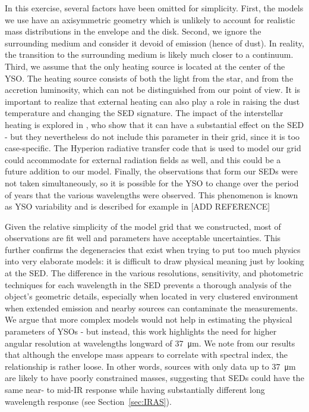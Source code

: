 In this exercise, several factors have been omitted for simplicity. First, the models we use have an axisymmetric geometry which is unlikely to account for realistic mass distributions in the envelope and the disk. Second, we ignore the surrounding medium and consider it devoid of emission (hence of dust). In reality, the transition to the surrounding medium is likely much closer to a continuum. Third, we assume that the only heating source is located at the center of the YSO. The heating source consists of both the light from the star, and from the accretion luminosity, which can not be distinguished from our point of view. It is important to realize that external heating can also play a role in raising the dust temperature and changing the SED signature. The impact of the interstellar heating is explored in \citet{Furlan:2016df}, who show that it can have a substantial effect on the SED - but they nevertheless do not include this parameter in their grid, since it is too case-specific. The Hyperion radiative transfer code that is used to model our grid could accommodate for external radiation fields as well, and this could be a future addition to our model. Finally, the observations that form our SEDs were not taken simultaneously, so it is possible for the YSO to change over the period of years that the various wavelengths were observed. This phenomenon is known as YSO variability and is described for example in [ADD REFERENCE]

Given the relative simplicity of the model grid that we constructed, most of observations are fit well and parameters have acceptable uncertainties. This further confirms the degeneracies that exist when trying to put too much physics into very elaborate models: it is difficult to draw physical meaning just by looking at the SED. The difference in the various resolutions, sensitivity, and photometric techniques for each wavelength in the SED prevents a thorough analysis of the object's geometric details, especially when located in very clustered environment when extended emission and nearby sources can contaminate the measurements. We argue that more complex models would not help in estimating the physical parameters of YSOs - but instead, this work highlights the need for higher angular resolution at wavelengths longward of \SI{37}{\um}. We note from our results that although the envelope mass appears to correlate with spectral index, the relationship is rather loose. In other words, sources with only data up to \SI{37}{\um} are likely to have poorly constrained masses, suggesting that SEDs could have the same near- to mid-IR response while having substantially different long wavelength response (see Section~\ref{sec:IRAS}). 

